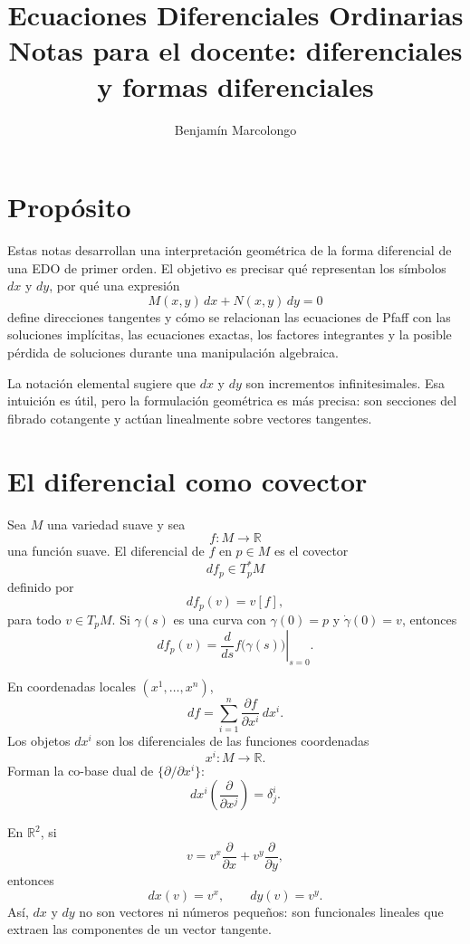 \documentclass[12pt,a4paper]{article}
\title{Ecuaciones Diferenciales Ordinarias\\Notas para el docente: diferenciales y formas diferenciales}
\author{Benjamín Marcolongo}
\date{}
\newcommand{\R}{\mathbb{R}}
\begin{document}
	\maketitle

	\section{Propósito}

	Estas notas desarrollan una interpretación geométrica de la forma diferencial de una EDO de primer orden. El objetivo es precisar qué representan los símbolos \(dx\) y \(dy\), por qué una expresión
	\[
	M(x,y)\,dx+N(x,y)\,dy=0
	\]
define direcciones tangentes y cómo se relacionan las ecuaciones de Pfaff con las soluciones implícitas, las ecuaciones exactas, los factores integrantes y la posible pérdida de soluciones durante una manipulación algebraica.

	La notación elemental sugiere que \(dx\) y \(dy\) son incrementos infinitesimales. Esa intuición es útil, pero la formulación geométrica es más precisa: son secciones del fibrado cotangente y actúan linealmente sobre vectores tangentes.

	\clearpage
	\section{El diferencial como covector}

	Sea \(M\) una variedad suave y sea
	\[
	f\colon M\longrightarrow\R
	\]
una función suave. El diferencial de \(f\) en \(p\in M\) es el covector
	\[
	df_p\in T_p^*M
	\]
definido por
	\[
	df_p(v)=v[f],
	\]
para todo \(v\in T_pM\). Si \(\gamma(s)\) es una curva con \(\gamma(0)=p\) y \(\dot{\gamma}(0)=v\), entonces
	\[
	df_p(v)
	=
	\left.\frac{d}{ds}f\bigl(\gamma(s)\bigr)\right|_{s=0}.
	\]

	En coordenadas locales \((x^1,\dots,x^n)\),
	\[
	df
	=
	\sum_{i=1}^{n}
	\frac{\partial f}{\partial x^i}\,dx^i.
	\]
Los objetos \(dx^i\) son los diferenciales de las funciones coordenadas
	\[
	x^i\colon M\longrightarrow\R.
	\]
Forman la co-base dual de \(\{\partial/\partial x^i\}\):
	\[
	dx^i\left(\frac{\partial}{\partial x^j}\right)
	=
	\delta^i_j.
	\]

	En \(\R^2\), si
	\[
	v=v^x\frac{\partial}{\partial x}
	+v^y\frac{\partial}{\partial y},
	\]
entonces
	\[
	dx(v)=v^x,
	\qquad
	dy(v)=v^y.
	\]
Así, \(dx\) y \(dy\) no son vectores ni números pequeños: son funcionales lineales que extraen las componentes de un vector tangente.
\end{document}
